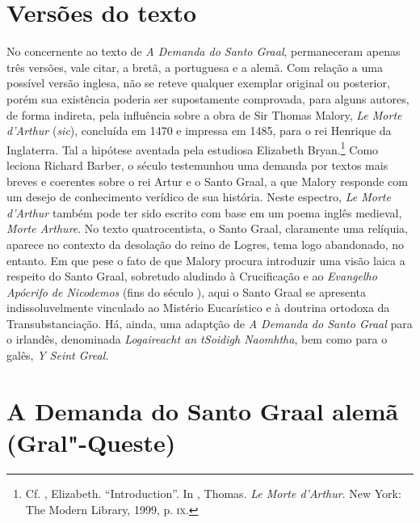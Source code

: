 \section{Versões do texto}

No concernente ao texto de \textit{A Demanda do Santo Graal}, permaneceram
apenas três versões, vale citar, a bretã, a portuguesa e a alemã. Com relação a
uma possível versão inglesa, não se reteve qualquer exemplar original ou
posterior, porém sua existência poderia ser supostamente comprovada, para alguns
autores, de forma indireta, pela influência sobre a obra de Sir Thomas Malory,
\textit{Le Morte d’Arthur} (\textit{sic}), concluída em 1470 e impressa em 1485,
para o rei Henrique  da Inglaterra. Tal a hipótese aventada pela
estudiosa Elizabeth Bryan.\footnote{ Cf. , Elizabeth. ``Introduction''. In
, Thomas. \textit{Le Morte d'Arthur}. New York: The Modern Library, 1999,
p. \textsc{ix}. } Como leciona Richard Barber, o século  testemunhou
uma demanda por textos mais breves e coerentes sobre o rei Artur e o Santo
Graal, a que Malory responde com um desejo de conhecimento verídico de sua história.
Neste espectro, \textit{Le Morte d’Arthur} também pode ter sido
escrito com base em um poema inglês medieval, \textit{Morte Arthure}. No texto
quatrocentista, o Santo Graal, claramente uma relíquia, aparece no contexto da
desolação do reino de Logres, tema logo abandonado, no entanto. Em que pese o
fato de que Malory procura introduzir uma visão laica a respeito do Santo Graal,
sobretudo aludindo à Crucificação e ao \textit{Evangelho Apócrifo de Nicodemos}
(fins do século ), aqui o Santo Graal se apresenta indissoluvelmente
vinculado ao Mistério Eucarístico e à doutrina ortodoxa da Transubstanciação.
Há, ainda, uma adaptção de \textit{A Demanda do Santo Graal}  para o irlandês,
denominada \textit{Logaireacht an tSoidigh Naomhtha}, bem como para o galês,
\textit{Y Seint Greal.}

\section{A Demanda do Santo Graal alemã (Gral"-Queste)}

